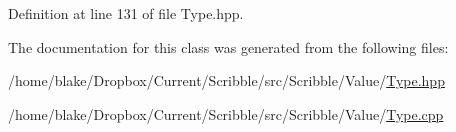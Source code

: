 Definition at line 131 of file Type.\-hpp.



The documentation for this class was generated from the following files\-:\begin{DoxyCompactItemize}
\item 
/home/blake/\-Dropbox/\-Current/\-Scribble/src/\-Scribble/\-Value/\hyperlink{_type_8hpp}{Type.\-hpp}\item 
/home/blake/\-Dropbox/\-Current/\-Scribble/src/\-Scribble/\-Value/\hyperlink{_type_8cpp}{Type.\-cpp}\end{DoxyCompactItemize}

